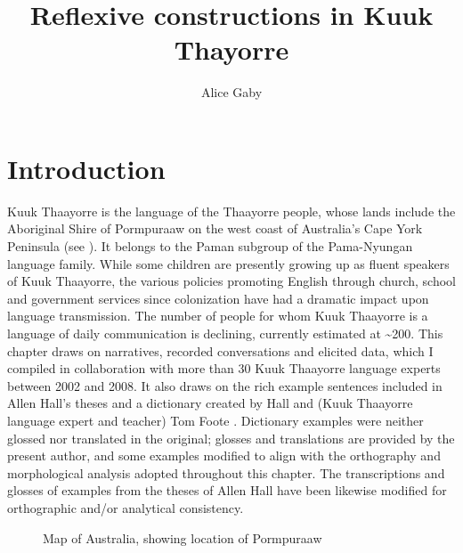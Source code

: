 \documentclass[output=paper]{langscibook}
\author{Alice Gaby\affiliation{Monash University}}
\title{Reflexive constructions in  Kuuk Thayorre}
\begin{document}
\maketitle


\section{Introduction}\label{sec:Gaby:1}

Kuuk Thaayorre is the language of the Thaayorre people, whose lands include the Aboriginal Shire of Pormpuraaw on the west coast of Australia’s Cape York Peninsula (see ). It belongs to the Paman subgroup of the Pama-Nyungan language family. While some children are presently growing up as fluent speakers of Kuuk Thaayorre, the various policies promoting English through church, school and government services since colonization have had a dramatic impact upon language transmission. The number of people for whom Kuuk Thaayorre is a language of daily communication is declining, currently estimated at {\textasciitilde}200. This chapter draws on narratives, recorded conversations and elicited data, which I compiled in collaboration with more than 30 Kuuk Thaayorre language experts between 2002 and 2008. It also draws on the rich example sentences included in Allen Hall’s theses \citeyear{Hall1968; Hall1972} and a dictionary created by Hall and (Kuuk Thaayorre language expert and teacher) Tom Foote \citep{FooteHall1992}. Dictionary examples were neither glossed nor translated in the original; glosses and translations are provided by the present author, and some examples modified to align with the orthography and morphological analysis adopted throughout this chapter. The transcriptions and glosses of examples from the theses of Allen Hall have been likewise modified for orthographic and/or analytical consistency.

  

 

\begin{figure}
    \caption{Map of Australia, showing location of Pormpuraaw}
\end{figure}
\end{document}
